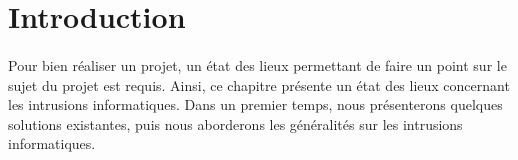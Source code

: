 \section*{Introduction}
	\paragraph{}
      Pour bien réaliser un projet, un état des lieux permettant de faire un point sur le sujet du projet est requis. Ainsi, ce chapitre présente un état des lieux concernant les intrusions informatiques. Dans un premier temps, nous présenterons quelques solutions existantes, puis nous aborderons les généralités sur les intrusions informatiques.